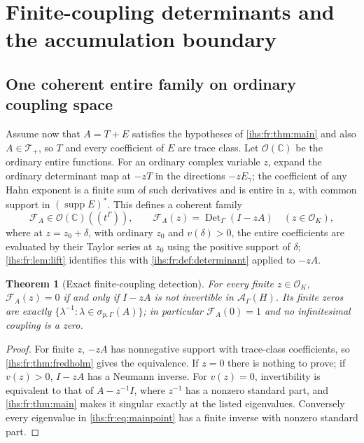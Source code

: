 \documentclass[11pt,a4paper]{article}
\numberwithin{equation}{section}
\newtheorem{theorem}{Theorem}[section]
\theoremstyle{definition}
\theoremstyle{remark}
\newcommand{\C}{\mathbb C}
\newcommand{\Ocal}{\mathcal O_K}
\newcommand{\Ahh}{\mathcal A_\Gamma(H)}
\newcommand{\supp}{\operatorname{supp}}
\newcommand{\Det}{\operatorname{Det}_\Gamma}
\newcommand{\TT}{\mathscr T}
\begin{document}
\section{Finite-coupling determinants and the accumulation boundary}\label{ihs:fr:sec:boundary}

\subsection{One coherent entire family on ordinary coupling space}\label{ihs:fr:sec:coupling}
Assume now that $A=T+E$ satisfies the hypotheses of \cref{ihs:fr:thm:main}
and also $A\in\TT_+$, so $T$ and every coefficient of $E$ are trace class.
Let $\mathcal O(\C)$ be the ordinary entire functions. For an ordinary complex
variable $z$, expand the ordinary determinant map at $-zT$ in the directions
$-zE_\gamma$; the coefficient of any Hahn exponent is a finite sum of such
derivatives and is entire in $z$, with common support in $(\supp E)^*$. This
defines a coherent family
\begin{equation}\label{ihs:fr:eq:couplingdet}
 \mathcal F_A\in\mathcal O(\C)((t^\Gamma)),\qquad
 \mathcal F_A(z)=\Det(I-zA)\quad(z\in\Ocal),
\end{equation}
where at $z=z_0+\delta$, with ordinary $z_0$ and $v(\delta)>0$, the entire
coefficients are evaluated by their Taylor series at $z_0$ using the
positive support of $\delta$; \cref{ihs:fr:lem:lift} identifies this with
\cref{ihs:fr:def:determinant} applied to $-zA$.

\begin{theorem}[Exact finite-coupling detection]\label{ihs:fr:thm:coupling}
For every finite $z\in\Ocal$,
$\mathcal F_A(z)=0$ if and only if $I-zA$ is not invertible in $\Ahh$. Its
finite zeros are exactly $\{\lambda^{-1}:\lambda\in\sigma_{p,\Gamma}(A)\}$;
in particular $\mathcal F_A(0)=1$ and no infinitesimal coupling is a zero.
\end{theorem}
\begin{proof}
For finite $z$, $-zA$ has nonnegative support with trace-class coefficients,
so \cref{ihs:fr:thm:fredholm} gives the equivalence. If $z=0$ there is
nothing to prove; if $v(z)>0$, $I-zA$ has a Neumann inverse. For $v(z)=0$,
invertibility is equivalent to that of $A-z^{-1}I$, where $z^{-1}$ has a
nonzero standard part, and \cref{ihs:fr:thm:main} makes it singular exactly
at the listed eigenvalues. Conversely every eigenvalue in
\eqref{ihs:fr:eq:mainpoint} has a finite inverse with nonzero standard part.
\end{proof}
\end{document}
